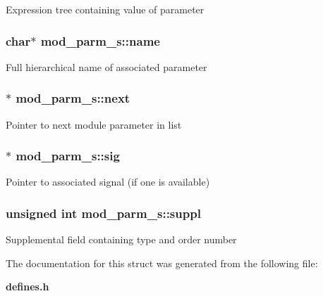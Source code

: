 Expression tree containing value of parameter 
\subsubsection{\setlength{\rightskip}{0pt plus 5cm}char$\ast$ mod\_\-parm\_\-s::name}\label{structmod__parm__s_m0}


Full hierarchical name of associated parameter 
\subsubsection{$\ast$ mod\_\-parm\_\-s::next}\label{structmod__parm__s_m6}


Pointer to next module parameter in list 
\subsubsection{$\ast$ mod\_\-parm\_\-s::sig}\label{structmod__parm__s_m5}


Pointer to associated signal (if one is available) 
\subsubsection{\setlength{\rightskip}{0pt plus 5cm}unsigned int mod\_\-parm\_\-s::suppl}\label{structmod__parm__s_m2}


Supplemental field containing type and order number 

The documentation for this struct was generated from the following file:\begin{CompactItemize}
\item 
{\bf defines.h}\end{CompactItemize}
